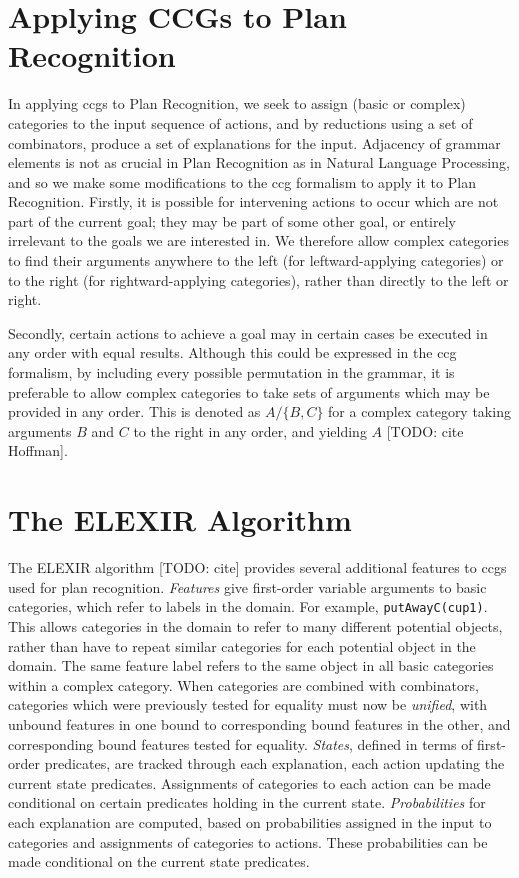 \section{Applying CCGs to Plan Recognition}

In applying \ac{ccg}s to Plan Recognition, we seek to assign (basic or complex) categories to the input sequence of actions, and by reductions using a set of combinators, produce a set of explanations for the input. Adjacency of grammar elements is not as crucial in Plan Recognition as in Natural Language Processing, and so we make some modifications to the \ac{ccg} formalism to apply it to Plan Recognition. Firstly, it is possible for intervening actions to occur which are not part of the current goal; they may be part of some other goal, or entirely irrelevant to the goals we are interested in. We therefore allow complex categories to find their arguments anywhere to the left (for leftward-applying categories) or to the right (for rightward-applying categories), rather than directly to the left or right.

Secondly, certain actions to achieve a goal may in certain cases be executed in any order with equal results. Although this could be expressed in the \ac{ccg} formalism, by including every possible permutation in the grammar, it is preferable to allow complex categories to take sets of arguments which may be provided in any order. This is denoted as $A/\{B, C\}$ for a complex category taking arguments $B$ and $C$ to the right in any order, and yielding $A$ [TODO: cite Hoffman].

\section{The ELEXIR Algorithm}

The ELEXIR algorithm [TODO: cite] provides several additional features to \ac{ccg}s used for plan recognition. \emph{Features} give first-order variable arguments to basic categories, which refer to labels in the domain. For example, \texttt{putAwayC(cup1)}. This allows categories in the domain to refer to many different potential objects, rather than have to repeat similar categories for each potential object in the domain. The same feature label refers to the same object in all basic categories within a complex category. When categories are combined with combinators, categories which were previously tested for equality must now be \emph{unified}, with unbound features in one bound to corresponding bound features in the other, and corresponding bound features tested for equality. \emph{States}, defined in terms of first-order predicates, are tracked through each explanation, each action updating the current state predicates. Assignments of categories to each action can be made conditional on certain predicates holding in the current state. \emph{Probabilities} for each explanation are computed, based on probabilities assigned in the input to categories and assignments of categories to actions. These probabilities can be made conditional on the current state predicates.

